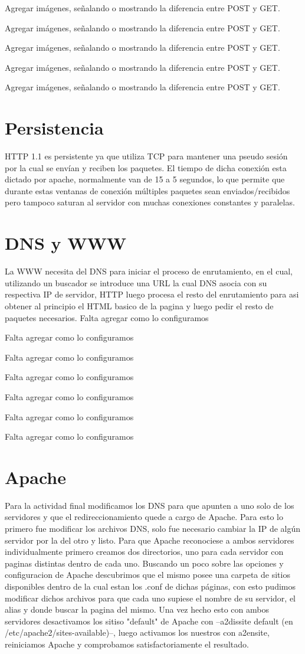 \documentclass[12pt,a4paper]{article}
\begin{document}
	Agregar imágenes, señalando o mostrando la diferencia entre POST y GET.
	
	Agregar imágenes, señalando o mostrando la diferencia entre POST y GET.
	
	Agregar imágenes, señalando o mostrando la diferencia entre POST y GET.
	
	Agregar imágenes, señalando o mostrando la diferencia entre POST y GET.
	
	Agregar imágenes, señalando o mostrando la diferencia entre POST y GET.
	
	\section{Persistencia}
	HTTP 1.1 es persistente ya que utiliza TCP para mantener una pseudo sesión por la cual se envían y reciben los paquetes. El tiempo de dicha conexión esta dictado por apache, normalmente van de 15 a 5 segundos, lo que permite que durante estas ventanas de conexión múltiples paquetes sean enviados/recibidos pero tampoco saturan al servidor con muchas conexiones constantes y paralelas.
	\section{DNS y WWW}
	La WWW necesita del DNS para iniciar el proceso de enrutamiento, en el cual, utilizando un buscador se introduce una URL la cual DNS asocia con su respectiva IP de servidor, HTTP luego procesa el resto del enrutamiento para asi obtener al principio el HTML basico de la pagina y luego pedir el resto de paquetes necesarios.
	Falta agregar como  lo configuramos
	
	Falta agregar como  lo configuramos
	
	Falta agregar como  lo configuramos
	
	Falta agregar como  lo configuramos
	
	Falta agregar como  lo configuramos
	
	Falta agregar como  lo configuramos
	
	Falta agregar como  lo configuramos
	
	
	\section{Apache}
	Para la actividad final modificamos los DNS para que apunten a uno solo de los servidores y que el redireccionamiento quede a cargo de Apache.
	Para esto lo primero fue modificar los archivos DNS, solo fue necesario cambiar la IP de algún servidor por la del otro y listo.
	Para que Apache reconociese a ambos servidores individualmente primero creamos dos directorios, uno para cada servidor con paginas distintas dentro de cada uno.
	Buscando un poco sobre las opciones y configuracion de Apache descubrimos que el mismo posee una carpeta de sitios disponibles dentro de la cual estan los .conf de dichas páginas, con esto pudimos modificar dichos archivos para que cada uno supiese el nombre de su servidor, el alias y donde buscar la pagina del mismo.
	Una vez hecho esto con ambos servidores desactivamos los sitiso "default" de Apache con --a2dissite default (en /etc/apache2/sites-available)--, luego activamos los nuestros con a2ensite, reiniciamos Apache y comprobamos satisfactoriamente el resultado. 
\end{document}
